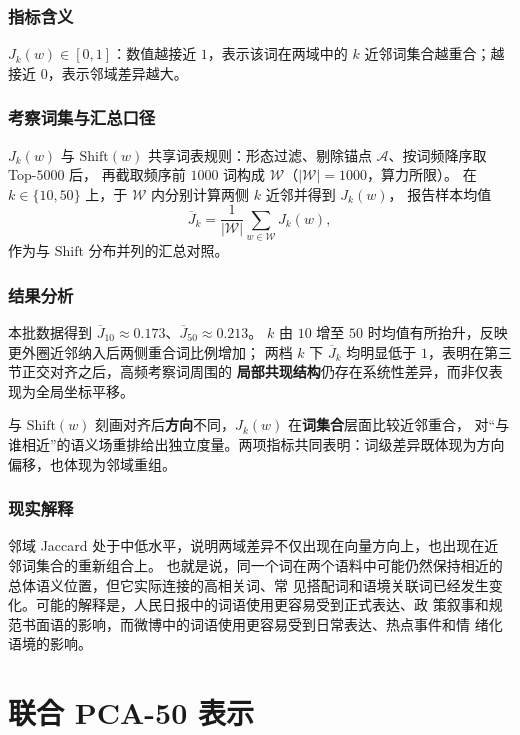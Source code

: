 \documentclass[withoutpreface]{cumcmthesis}
\begin{document}
\subsubsection{指标含义}
$J_k(w)\in[0,1]$：数值越接近 $1$，表示该词在两域中的 $k$ 近邻词集合越重合；越接近 $0$，表示邻域差异越大。

\subsubsection{考察词集与汇总口径}
$J_k(w)$ 与 $\mathrm{Shift}(w)$ 共享词表规则：形态过滤、剔除锚点 $\mathcal{A}$、按词频降序取 Top-$5000$ 后，
再截取频序前 $1000$ 词构成 $\mathcal{W}$（$|\mathcal{W}|{=}1000$，算力所限）。
在 $k\in\{10,50\}$ 上，于 $\mathcal{W}$ 内分别计算两侧 $k$ 近邻并得到 $J_k(w)$，
报告样本均值
\begin{equation}
  \overline{J}_k=\frac{1}{|\mathcal{W}|}\sum_{w\in\mathcal{W}} J_k(w),
\end{equation}
作为与 $\mathrm{Shift}$ 分布并列的汇总对照。

\subsubsection{结果分析}
本批数据得到 $\overline{J}_{10}\approx0.173$、$\overline{J}_{50}\approx0.213$。
$k$ 由 $10$ 增至 $50$ 时均值有所抬升，反映更外圈近邻纳入后两侧重合词比例增加；
两档 $k$ 下 $\overline{J}_k$ 均明显低于 $1$，表明在第三节正交对齐之后，高频考察词周围的
\textbf{局部共现结构}仍存在系统性差异，而非仅表现为全局坐标平移。

与 $\mathrm{Shift}(w)$ 刻画对齐后\textbf{方向}不同，$J_k(w)$ 在\textbf{词集合}层面比较近邻重合，
对“与谁相近”的语义场重排给出独立度量。两项指标共同表明：词级差异既体现为方向偏移，也体现为邻域重组。

\subsubsection{现实解释}
邻域 Jaccard 处于中低水平，说明两域差异不仅出现在向量方向上，也出现在近邻词集合的重新组合上。
也就是说，同一个词在两个语料中可能仍然保持相近的总体语义位置，但它实际连接的高相关词、常
见搭配词和语境关联词已经发生变化。可能的解释是，人民日报中的词语使用更容易受到正式表达、政
策叙事和规范书面语的影响，而微博中的词语使用更容易受到日常表达、热点事件和情
绪化语境的影响。

\FloatBarrier

\section{联合 PCA-50 表示}
\end{document}
